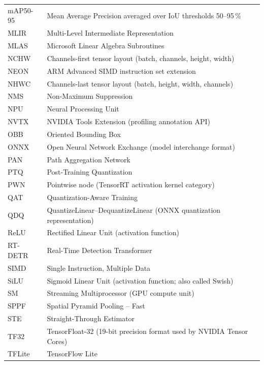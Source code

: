 \documentclass[12pt,a4paper]{report}
\begin{document}
\begin{longtable}{@{}p{3cm}p{10cm}@{}}
mAP50-95     & Mean Average Precision averaged over IoU thresholds 50–95\,\% \\[2pt]
MLIR         & Multi-Level Intermediate Representation \\[2pt]
MLAS         & Microsoft Linear Algebra Subroutines \\[2pt]
NCHW         & Channels-first tensor layout (batch, channels, height, width) \\[2pt]
NEON         & ARM Advanced SIMD instruction set extension \\[2pt]
NHWC         & Channels-last tensor layout (batch, height, width, channels) \\[2pt]
NMS          & Non-Maximum Suppression \\[2pt]
NPU          & Neural Processing Unit \\[2pt]
NVTX         & NVIDIA Tools Extension (profiling annotation API) \\[2pt]
OBB          & Oriented Bounding Box \\[2pt]
ONNX         & Open Neural Network Exchange (model interchange format) \\[2pt]
PAN          & Path Aggregation Network \\[2pt]
PTQ          & Post-Training Quantization \\[2pt]
PWN          & Pointwise node (TensorRT activation kernel category) \\[2pt]
QAT          & Quantization-Aware Training \\[2pt]
QDQ          & QuantizeLinear–DequantizeLinear (ONNX quantization representation) \\[2pt]
ReLU         & Rectified Linear Unit (activation function) \\[2pt]
RT-DETR      & Real-Time Detection Transformer \\[2pt]
SIMD         & Single Instruction, Multiple Data \\[2pt]
SiLU         & Sigmoid Linear Unit (activation function; also called Swish) \\[2pt]
SM           & Streaming Multiprocessor (GPU compute unit) \\[2pt]
SPPF         & Spatial Pyramid Pooling – Fast \\[2pt]
STE          & Straight-Through Estimator \\[2pt]
TF32         & TensorFloat-32 (19-bit precision format used by NVIDIA Tensor Cores) \\[2pt]
TFLite       & TensorFlow Lite \\[2pt]

\end{longtable}
\end{document}
